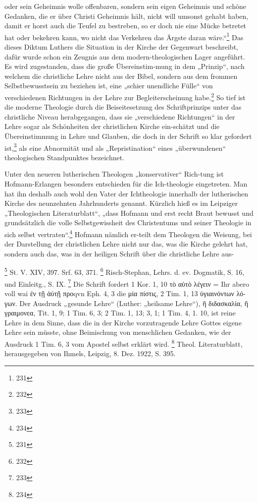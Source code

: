 oder sein Geheimnis wolle offenbaren, sondern sein eigen Geheimnis und schöne Gedanken, die er über Christi Geheimnis hält, nicht will umsonst gehabt haben, damit er horst auch die Teufel zu bestreben, so er doch nie eine Mücke betretet hat oder bekehren kann, wo nicht das Verkehren das Ärgste daran wäre.“\footnote{231} Das dieses Diktum Luthers die Situation in der Kirche der Gegenwart beschreibt, dafür wurde schon ein Zeugnis aus dem modern-theologischen Lager angeführt. Es wird zugestanden, dass die große Übereinstim-mung in dem „Prinzip“, nach welchem die christliche Lehre nicht aus der Bibel, sondern aus dem frommen Selbstbewusstsein zu beziehen ist, eine „schier unendliche Fülle“ von verschiedenen Richtungen in der Lehre zur Begleiterscheinung habe.\footnote{232} So tief ist die moderne Theologie durch die Beiseitesetzung des Schriftprinzips unter das christliche Niveau herabgegangen, dass sie „verschiedene Richtungen“ in der Lehre sogar als Schönheiten der christlichen Kirche ein-schätzt und die Übereinstimmung in Lehre und Glauben, die doch in der Schrift so klar gefordert ist,\footnote{233} als eine Abnormität und als „Repristination“ eines „überwundenen“ theologischen Standpunktes bezeichnet.

Unter den neueren lutherischen Theologen „konservativer“ Rich-tung ist Hofmann-Erlangen besonders entschieden für die Ich-theologie eingetreten. Man hat ihn deshalb auch wohl den Vater der Ichtheologie innerhalb der lutherischen Kirche des neunzehnten Jahrhunderts genannt. Kürzlich hieß es im Leipziger „Theologischen Literaturblatt“, „dass Hofmann und erst recht Braut bewusst und grundsätzlich die volle Selbstgewissheit des Christentums und seiner Theologie in sich selbst vertraten“.\footnote{234} Hofmann nämlich er-teilt dem Theologen die Weisung, bei der Darstellung der christlichen Lehre nicht nur das, was die Kirche gelehrt hat, sondern auch das, was in der heiligen Schrift über die christliche Lehre aus-

\footnote{231} St. V. XIV, 397. Srf. 63, 371.
\footnote{232} Risch-Stephan, Lehrs. d. ev. Dogmatik, S. 16, und Einleitg., S. IX.
\footnote{233} Die Schrift fordert 1 Kor. 1, 10 \textgreek{τὸ αὐτὸ λέγειν} = Ihr abero voll wai \textgreek{ἐν τῇ ἀύτῇ} προqvn Eph. 4, 3 die \textgreek{μία πίστις}, 2 Tim. 1, 13 \textgreek{ὑγιαινόντων λόγων}. Der Ausdruck „gesunde Lehre“ (Luther: „heilsame Lehre“), \textgreek{ἢ διδασκαλία, ἢ γραιμονεα}, Tit. 1, 9; 1 Tim. 6, 3; 2 Tim. 1, 13; 3, 1; 1 Tim. 4, 1. 10, ist reine Lehre in dem Sinne, dass die in der Kirche vorzutragende Lehre Gottes eigene Lehre sein müsste, ohne Beimischung von menschlichen Gedanken, wie der Ausdruck 1 Tim. 6, 3 vom Apostel selbst erklärt wird.
\footnote{234} Theol. Literaturblatt, herausgegeben von Ihmels, Leipzig, 8. Dez. 1922, S. 395.